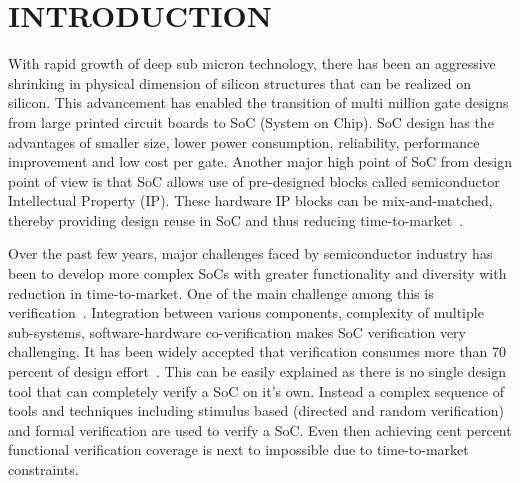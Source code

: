 \chapter{INTRODUCTION}


With rapid growth of deep sub micron technology, there has been an aggressive shrinking in physical dimension of silicon structures that can be realized on silicon. This advancement has enabled the transition of multi million gate designs from large printed circuit boards to SoC (System on Chip). SoC design has the advantages of smaller size, lower power consumption, reliability, performance improvement and low cost per gate. Another major high point of SoC from design point of view is that SoC allows use of pre-designed blocks called semiconductor Intellectual Property (IP). These hardware IP blocks can be mix-and-matched, thereby providing design reuse in SoC and thus reducing time-to-market~\citep{ieee:SOC:2010}. 


 Over the past few years, major challenges faced by semiconductor industry has been to develop more complex SoCs with greater functionality and diversity with reduction in time-to-market. One of the main challenge among this is verification~\citep{soc}. Integration between various components, complexity of multiple sub-systems, software-hardware co-verification makes SoC verification very challenging. It has been widely accepted that verification consumes more than 70 percent of design effort~\citep{phd:zhang}. This can be easily explained as there is no single design tool that can completely verify a SoC on it's own. Instead a complex sequence of tools and techniques including stimulus based (directed and random verification) and formal verification are used to verify a SoC.  Even then achieving cent percent functional verification coverage is next to impossible due to time-to-market constraints.


